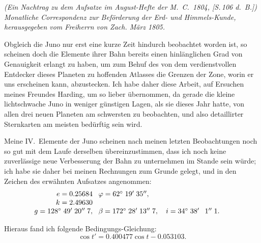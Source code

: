 \documentclass[12pt,a4paper]{article}
\begin{document}
\begin{center}
\textit{(Ein Nachtrag zu dem Aufsatze im August-Hefte der M.\ C.\ 1804, [S.\,106 d.\ B.])}\\[4pt]
\textit{Monatliche Correspondenz zur Beförderung der Erd- und Himmels-Kunde,}\\
\textit{herausgegeben vom Freiherrn von Zach. März 1805.}
\end{center}

\vspace{1em}

Obgleich die Juno nur erst eine kurze Zeit hindurch beobachtet worden
ist, so scheinen doch die Elemente ihrer Bahn bereits einen hinlänglichen Grad
von Genauigkeit erlangt zu haben, um zum Behuf des von dem verdienstvollen
Entdecker dieses Planeten zu hoffenden Atlasses die Grenzen der Zone, worin er
uns erscheinen kann, abzustecken. Ich habe daher diese Arbeit, auf Ersuchen
meines Freundes Harding, um so lieber übernommen, da gerade die kleine
lichtschwache Juno in weniger günstigen Lagen, als sie dieses Jahr hatte, von
allen drei neuen Planeten am schwersten zu beobachten, und also detaillirter
Sternkarten am meisten bedürftig sein wird.

Meine IV.\ Elemente der Juno scheinen nach meinen letzten Beobachtungen
noch so gut mit dem Laufe derselben übereinzustimmen, dass ich noch keine
zuverlässige neue Verbesserung der Bahn zu unternehmen im Stande sein würde;
ich habe sie daher bei meinen Rechnungen zum Grunde gelegt, und in den
Zeichen des erwähnten Aufsatzes angenommen:
\[
\begin{array}{r@{\;\;\;}l@{\qquad}r@{\;\;\;}l}
e = 0.25684 & \varphi = 62^{\circ}\;19'\;35'',\\
k = 2.49630 & \\
g = 128^{\circ}\;49'\;20''\;7, & \beta = 172^{\circ}\;28'\;13''\;7,\quad i = 34^{\circ}\;38'\;\phantom{0}1''\;1.
\end{array}
\]

Hieraus fand ich folgende Bedingungs-Gleichung:
\[
\cos t' = 0.400477\cos t - 0.053103.
\]
\end{document}
